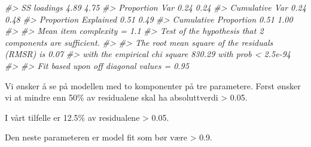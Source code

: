 \documentclass[
]{article}
\newenvironment{Shaded}{\begin{snugshade}}{\end{snugshade}}
\newcommand{\CommentTok}[1]{\textcolor[rgb]{0.56,0.35,0.01}{\textit{#1}}}
\newcommand{\DecValTok}[1]{\textcolor[rgb]{0.00,0.00,0.81}{#1}}
\newcommand{\FloatTok}[1]{\textcolor[rgb]{0.00,0.00,0.81}{#1}}
\newcommand{\FunctionTok}[1]{\textcolor[rgb]{0.00,0.00,0.00}{#1}}
\newcommand{\NormalTok}[1]{#1}
\newcommand{\OtherTok}[1]{\textcolor[rgb]{0.56,0.35,0.01}{#1}}
\newcommand{\SpecialCharTok}[1]{\textcolor[rgb]{0.00,0.00,0.00}{#1}}
\begin{document}
\begin{Shaded}
\begin{Highlighting}[]
\CommentTok{\#\textgreater{} SS loadings           4.89 4.75}
\CommentTok{\#\textgreater{} Proportion Var        0.24 0.24}
\CommentTok{\#\textgreater{} Cumulative Var        0.24 0.48}
\CommentTok{\#\textgreater{} Proportion Explained  0.51 0.49}
\CommentTok{\#\textgreater{} Cumulative Proportion 0.51 1.00}
\CommentTok{\#\textgreater{} }
\CommentTok{\#\textgreater{} Mean item complexity =  1.1}
\CommentTok{\#\textgreater{} Test of the hypothesis that 2 components are sufficient.}
\CommentTok{\#\textgreater{} }
\CommentTok{\#\textgreater{} The root mean square of the residuals (RMSR) is  0.07 }
\CommentTok{\#\textgreater{}  with the empirical chi square  830.29  with prob \textless{}  2.5e{-}94 }
\CommentTok{\#\textgreater{} }
\CommentTok{\#\textgreater{} Fit based upon off diagonal values = 0.95}
\end{Highlighting}
\end{Shaded}

Vi ønsker å se på modellen med to komponenter på tre parametere. Først ønsker vi at mindre enn 50\% av residualene skal ha absoluttverdi \textgreater{} 0.05.

\begin{Shaded}
\end{Shaded}

I vårt tilfelle er 12.5\% av residualene \textgreater{} 0.05.

Den neste parameteren er model fit som bør være \textgreater{} 0.9.

\begin{Shaded}
\end{Shaded}
\end{document}
